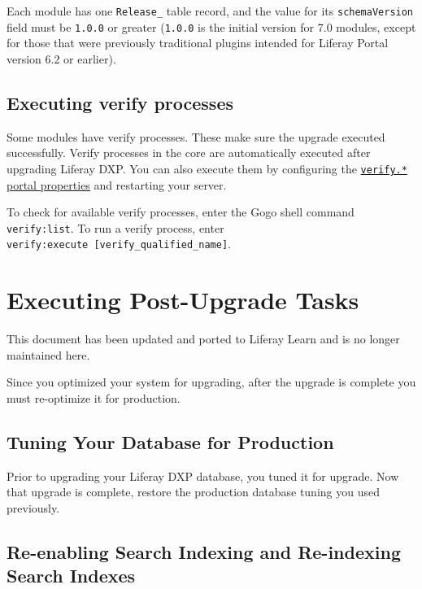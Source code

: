 Each module has one \texttt{Release\_} table record, and the value for
its \texttt{schemaVersion} field must be \texttt{1.0.0} or greater
(\texttt{1.0.0} is the initial version for 7.0 modules, except for those
that were previously traditional plugins intended for Liferay Portal
version 6.2 or earlier).

\section{Executing verify processes}\label{executing-verify-processes}

Some modules have verify processes. These make sure the upgrade executed
successfully. Verify processes in the core are automatically executed
after upgrading Liferay DXP. You can also execute them by configuring
the
\href{https://docs.liferay.com/dxp/portal/7.2-latest/propertiesdoc/portal.properties.html\#Verify}{\texttt{verify.*}
portal properties} and restarting your server.

To check for available verify processes, enter the Gogo shell command
\texttt{verify:list}. To run a verify process, enter
\texttt{verify:execute\ {[}verify\_qualified\_name{]}}.

\chapter{Executing Post-Upgrade
Tasks}\label{executing-post-upgrade-tasks}

{This document has been updated and ported to Liferay Learn and is no
longer maintained here.}

Since you optimized your system for upgrading, after the upgrade is
complete you must re-optimize it for production.

\section{Tuning Your Database for
Production}\label{tuning-your-database-for-production}

Prior to upgrading your Liferay DXP database, you tuned it for upgrade.
Now that upgrade is complete, restore the production database tuning you
used previously.

\section{Re-enabling Search Indexing and Re-indexing Search
Indexes}\label{re-enabling-search-indexing-and-re-indexing-search-indexes}


